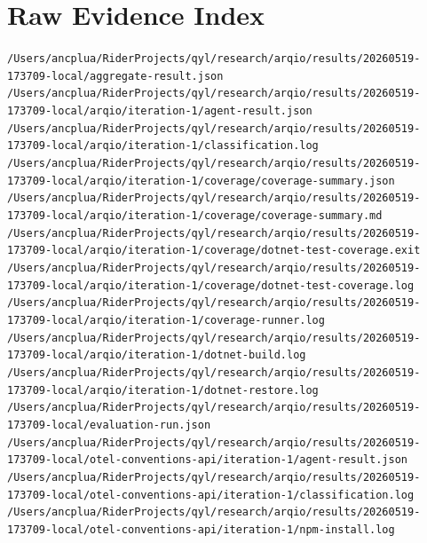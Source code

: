 \section{Raw Evidence Index}
\noindent \texttt{/Users/ancplua/RiderProjects/qyl/research/arqio/results/20260519-173709-local/aggregate-result.json}\\
\noindent \texttt{/Users/ancplua/RiderProjects/qyl/research/arqio/results/20260519-173709-local/arqio/iteration-1/agent-result.json}\\
\noindent \texttt{/Users/ancplua/RiderProjects/qyl/research/arqio/results/20260519-173709-local/arqio/iteration-1/classification.log}\\
\noindent \texttt{/Users/ancplua/RiderProjects/qyl/research/arqio/results/20260519-173709-local/arqio/iteration-1/coverage/coverage-summary.json}\\
\noindent \texttt{/Users/ancplua/RiderProjects/qyl/research/arqio/results/20260519-173709-local/arqio/iteration-1/coverage/coverage-summary.md}\\
\noindent \texttt{/Users/ancplua/RiderProjects/qyl/research/arqio/results/20260519-173709-local/arqio/iteration-1/coverage/dotnet-test-coverage.exit}\\
\noindent \texttt{/Users/ancplua/RiderProjects/qyl/research/arqio/results/20260519-173709-local/arqio/iteration-1/coverage/dotnet-test-coverage.log}\\
\noindent \texttt{/Users/ancplua/RiderProjects/qyl/research/arqio/results/20260519-173709-local/arqio/iteration-1/coverage-runner.log}\\
\noindent \texttt{/Users/ancplua/RiderProjects/qyl/research/arqio/results/20260519-173709-local/arqio/iteration-1/dotnet-build.log}\\
\noindent \texttt{/Users/ancplua/RiderProjects/qyl/research/arqio/results/20260519-173709-local/arqio/iteration-1/dotnet-restore.log}\\
\noindent \texttt{/Users/ancplua/RiderProjects/qyl/research/arqio/results/20260519-173709-local/evaluation-run.json}\\
\noindent \texttt{/Users/ancplua/RiderProjects/qyl/research/arqio/results/20260519-173709-local/otel-conventions-api/iteration-1/agent-result.json}\\
\noindent \texttt{/Users/ancplua/RiderProjects/qyl/research/arqio/results/20260519-173709-local/otel-conventions-api/iteration-1/classification.log}\\
\noindent \texttt{/Users/ancplua/RiderProjects/qyl/research/arqio/results/20260519-173709-local/otel-conventions-api/iteration-1/npm-install.log}\\
